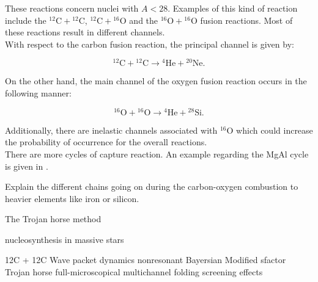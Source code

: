 \documentclass[openany]{book}
\begin{document}
These reactions concern nuclei with $A < 28$. Examples of this kind of reaction include the $\mathrm{{}^{12}C + {}^{12}C}$,  $\mathrm{{}^{12}C + {}^{16}O}$ and the  $\mathrm{{}^{16}O + {}^{16}O}$ fusion reactions. Most of these reactions result in different channels. \\ 

With respect to the carbon fusion reaction, the principal channel is given by: 

\begin{equation} \label{eq:reaction_C12fusion_alpha20Ne}
	\mathrm{{}^{12}C + {}^{12}C \rightarrow {}^{4}He + {}^{20}Ne}. 
\end{equation}

On the other hand, the main channel of the oxygen fusion reaction occurs in the following manner:

\begin{equation} \label{eq:reaction_O12fusion_alpha28Si}
	\mathrm{{}^{16}O + {}^{16}O \rightarrow {}^{4}He + {}^{28}Si}. 
\end{equation}

Additionally, there are inelastic channels associated with $\mathrm{{}^{16}O}$ which could increase the probability of occurrence for the overall reactions.  \\



There are more cycles of capture reaction. An example regarding the MgAl cycle is given in \cite{lotay_doherty_janssens_seweryniak_albers_almaraz-calderon_carpenter_champagne_chiara_hoffman_et_2022}.

Explain the different chains going on during the carbon-oxygen combustion to heavier elements like iron or silicon.

The Trojan horse method\cite{spitaleri_mukhamedzhanov_blokhintsev_cognata_pizzone_tumino_2011}

nucleosynthesis in massive stars \cite{pignatari_hirschi_wiescher_gallino_bennett_beard_fryer_herwig_rockefeller_timmes_et_2012}

12C + 12C Wave packet dynamics\cite{diaz-torres_wiescher_2018}
nonresonant Bayersian \cite{li_fang_bucher_li_ru_tang_2020}
Modified sfactor \cite{luo_wen_lin_yang_jia_yang_huang_chang_zhang_yang_et_2022}
Trojan horse \cite{mukhamedzhanov_pang_kadyrov_2019}
\cite{mukhamedzanov_2022}
full-microscopical \cite{taniguchi_kimura_2021}
multichannel folding \cite{assuncao_descouvemont_2016}
screening effects \cite{koyuncu_soylu_2018}
\end{document}
